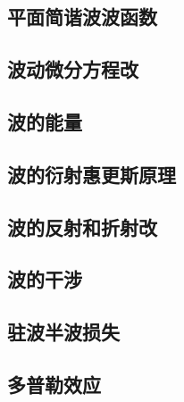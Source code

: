 \documentclass[UTF8]{article}
\begin{document}
\subsection{平面简谐波波函数}
\subsection{波动微分方程改}
\subsection{波的能量}
\subsection{波的衍射\;\;惠更斯原理}
\subsection{波的反射和折射改}
\subsection{波的干涉}
\subsection{驻波\;\;半波损失}
\subsection{多普勒效应}
\end{document}
